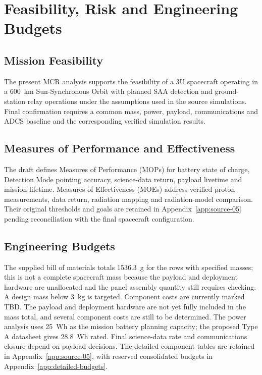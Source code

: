\section{Feasibility, Risk and Engineering Budgets}\label{mission-completion-requirements}
\subsection{Mission Feasibility}\label{sec:mission-feasibility}
The present MCR analysis supports the feasibility of a 3U spacecraft operating in a 600~km Sun-Synchronous Orbit with planned SAA detection and ground-station relay operations under the assumptions used in the source simulations. Final confirmation requires a common mass, power, payload, communications and ADCS baseline and the corresponding verified simulation results.

\subsection{Measures of Performance and Effectiveness}\label{measures-of-performance-mops}
The draft defines Measures of Performance (MOPs) for battery state of charge, Detection Mode pointing accuracy, science-data return, payload livetime and mission lifetime. Measures of Effectiveness (MOEs) address verified proton measurements, data return, radiation mapping and radiation-model comparison. Their original thresholds and goals are retained in Appendix~\ref{app:source-05} pending reconciliation with the final spacecraft configuration.

\subsection{Engineering Budgets}\label{sec:budget-closure}
The supplied bill of materials totals 1536.3~g for the rows with specified masses; this is not a complete spacecraft mass because the payload and deployment hardware are unallocated and the panel assembly quantity still requires checking. A design mass below 3~kg is targeted. Component costs are currently marked TBD. The payload and deployment hardware are not yet fully included in the mass total, and several component costs are still to be determined. The power analysis uses 25~Wh as the mission battery planning capacity; the proposed Type A datasheet gives 28.8~Wh rated. Final science-data rate and communications closure depend on payload decisions. The detailed component tables are retained in Appendix~\ref{app:source-05}, with reserved consolidated budgets in Appendix~\ref{app:detailed-budgets}.

